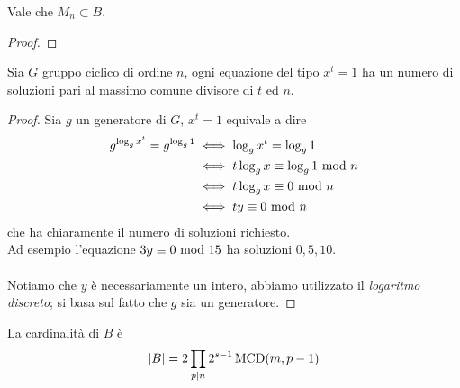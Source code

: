 \begin{lemma}
	Vale che $M_n\subset B$.
\end{lemma}
\begin{proof}
\end{proof}
\begin{lemma}
	Sia $G$ gruppo ciclico di ordine $n$, ogni equazione del tipo $x^t=1$ ha un numero di soluzioni pari al massimo comune divisore di $t$ ed $n$.
\end{lemma}
\begin{proof}
	Sia $g$ un generatore di $G$, $x^t=1$ equivale a dire 
	\begin{align*}
	g^{\log_gx^t}=g^{\log_g1}
	&\iff\log_gx^t=\log_g1\\
	&\iff t\log_gx\equiv\log_g1 \ \mathrm{mod}\ n\\
	&\iff t\log_gx\equiv0 \ \mathrm{mod}\ n\\
	&\iff ty\equiv0\ \mathrm{mod}\ n
	\end{align*}
	che ha chiaramente il numero di soluzioni richiesto. \\ Ad esempio l'equazione $3y\equiv0\ \mathrm{mod}\ 15$ ha soluzioni $0,5,10$. \\ \\ Notiamo che $y$ è necessariamente un intero, abbiamo utilizzato il \textit{logaritmo discreto}; si basa sul fatto che $g$ sia un generatore.
\end{proof}
\begin{lemma}
	La cardinalità di $B$ è 
	\begin{equation*}
	\left|B\right|=2\prod_{p\mid n}2^{s-1}\operatorname{\mathrm{MCD}}(m,p-1)
	\end{equation*}
\end{lemma}
